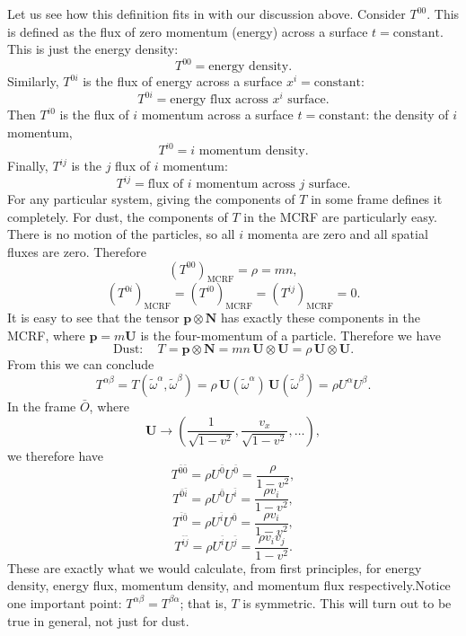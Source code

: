 \documentclass[12pt]{book}
\begin{document}
    Let us see how this definition fits in with our discussion above. Consider \(T^{00}\). This is defined as the flux of zero momentum (energy) across a surface \(t = \text{constant}\). This is just the energy density:
    \[
    T^{00} = \text{energy density}. \tag{4.15}
    \]
    Similarly, \(T^{0i}\) is the flux of energy across a surface \(x^i = \text{constant}\):
    \[
    T^{0i} = \text{energy flux across \(x^i\) surface}. \tag{4.16}
    \]
    Then \(T^{i0}\) is the flux of \(i\) momentum across a surface \(t = \text{constant}\): the density of \(i\) momentum,
    \[
    T^{i0} = \text{\(i\) momentum density}. \tag{4.17}
    \]
    Finally, \(T^{ij}\) is the \(j\) flux of \(i\) momentum:
    \[
    T^{ij} = \text{flux of \(i\) momentum across \(j\) surface}. \tag{4.18}
    \]
    For any particular system, giving the components of \(T\) in some frame defines it completely. For dust, the components of \(T\) in the MCRF are particularly easy. There is no motion of the particles, so all \(i\) momenta are zero and all spatial fluxes are zero. Therefore
    \[
    (T^{00})_{\text{MCRF}} = \rho = mn,
    \]
    \[
    (T^{0i})_{\text{MCRF}} = (T^{i0})_{\text{MCRF}} = (T^{ij})_{\text{MCRF}} = 0.
    \]
    It is easy to see that the tensor \(\mathbf{p} \otimes \mathbf{N}\) has exactly these components in the MCRF, where \(\mathbf{p} = m\mathbf{U}\) is the four-momentum of a particle. Therefore we have
    \[
    \text{Dust}: \quad T = \mathbf{p} \otimes \mathbf{N} = mn \, \mathbf{U} \otimes \mathbf{U} = \rho \, \mathbf{U} \otimes \mathbf{U}. \tag{4.19}
    \]
    From this we can conclude
    \[
    T^{\alpha\beta} = T(\tilde{\omega}^\alpha, \tilde{\omega}^\beta) = \rho \, \mathbf{U}(\tilde{\omega}^\alpha) \, \mathbf{U}(\tilde{\omega}^\beta) = \rho U^\alpha U^\beta. \tag{4.20}
    \]
    In the frame \(\bar{O}\), where
    \[
    \mathbf{U} \rightarrow \left(\frac{1}{\sqrt{1 - v^2}}, \frac{v_x}{\sqrt{1 - v^2}}, \ldots \right),
    \]
    we therefore have
    \[
    T^{\bar{0}\bar{0}} = \rho U^{\bar{0}} U^{\bar{0}} = \frac{\rho}{1 - v^2},
    \]
    \[
    T^{\bar{0}\bar{i}} = \rho U^{\bar{0}} U^{\bar{i}} = \frac{\rho v_i}{1 - v^2},
    \]
    \[
    T^{\bar{i}\bar{0}} = \rho U^{\bar{i}} U^{\bar{0}} = \frac{\rho v_i}{1 - v^2},
    \]
    \[
    T^{\bar{i}\bar{j}} = \rho U^{\bar{i}} U^{\bar{j}} = \frac{\rho v_i v_j}{1 - v^2}.
    \tag{4.21}
    \]
    These are exactly what we would calculate, from first principles, for energy density, energy flux, momentum density, and momentum flux respectively.Notice one important point: \(T^{\alpha\beta} = T^{\beta\alpha}\); that is, \(T\) is symmetric. This will turn out to be true in general, not just for dust.
    
\end{document}
